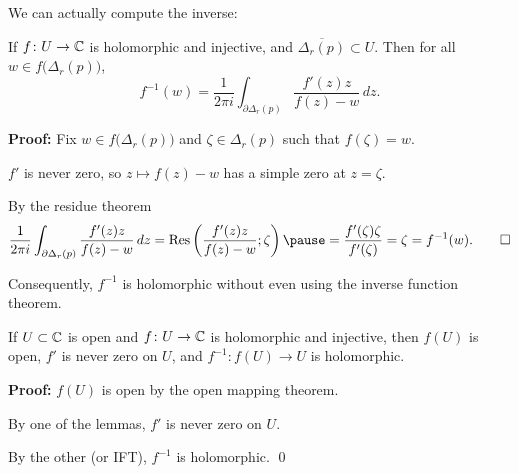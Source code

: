 \documentclass[10pt,aspectratio=169]{beamer}
\begin{document}
\begin{frame}
We can actually compute the inverse:

\begin{lemma}
If $f \colon U \to {\mathbb{C}}$ is holomorphic and injective, and
$\overline{\Delta_r(p)} \subset U$.  Then for all $w \in
f\bigl(\Delta_r(p)\bigr)$,
\begin{equation*}
f^{-1}(w) = \frac{1}{2\pi i} \int_{\partial \Delta_r(p)}
\frac{f'(z)z}{f(z)-w} \, dz .
\end{equation*}
\end{lemma}

\pause

\textbf{Proof:}
Fix $w \in f\bigl(\Delta_r(p)\bigr)$ and $\zeta \in \Delta_r(p)$
such that $f(\zeta) = w$.

\medskip
\pause

$f'$ is never zero, so $z \mapsto f(z)-w$ has a simple
zero at $z=\zeta$.

\medskip
\pause

By the residue theorem
\begin{equation*}
\frac{1}{2\pi i} \int_{\partial \Delta_r(p)}
\frac{f'(z)z}{f(z)-w} \, dz
=
\operatorname{Res}\left(\frac{f'(z)z}{f(z)-w};\zeta\right)
\pause
=
\frac{f'(\zeta)\zeta}{f'(\zeta)} = \zeta = f^{-1}(w) .
\qed
\end{equation*}

\pause
\medskip

Consequently, $f^{-1}$ is holomorphic without even using the inverse function
theorem.
\end{frame}

\begin{frame}
\begin{theorem}
If $U \subset {\mathbb{C}}$ is open and $f \colon U \to {\mathbb{C}}$ is holomorphic and
injective, then $f(U)$ is open, $f'$ is never zero on $U$, and $f^{-1}
\colon f(U) \to U$ is holomorphic.
\end{theorem}

\medskip
\pause

\textbf{Proof:}
$f(U)$ is open by the open mapping theorem.

\medskip
\pause

By one of the lemmas, $f'$ is never zero on $U$.

\medskip
\pause

By the other (or IFT), $f^{-1}$ is holomorphic.
\qed
\end{frame}
\end{document}
